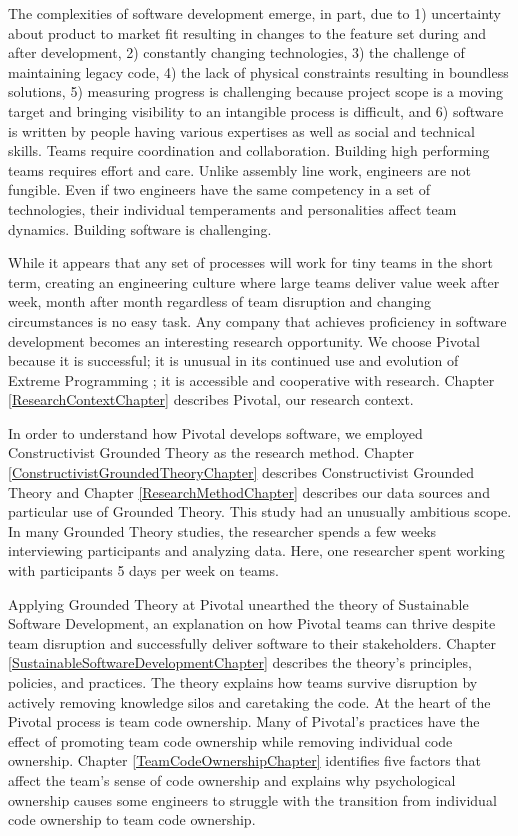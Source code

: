 The complexities of software development emerge, in part, due to 1) uncertainty about product to market fit resulting in changes to the feature set during and after development, 2) constantly changing technologies, 3) the challenge of maintaining legacy code, 4) the lack of physical constraints resulting in boundless solutions, 5) measuring progress is challenging because project scope is a moving target and bringing visibility to an intangible process is difficult, and 6) software is written by people having various expertises as well as social and technical skills. Teams require coordination and collaboration. Building high performing teams requires effort and care. Unlike assembly line work, engineers are not fungible. Even if two engineers have the same competency in a set of technologies, their individual temperaments and personalities affect team dynamics. Building software is challenging. 

While it appears that any set of processes will work for tiny teams in the short term, creating an engineering culture where large teams deliver value week after week, month after month regardless of team disruption and changing circumstances is no easy task. Any company that achieves proficiency in software development becomes an interesting research opportunity. We choose Pivotal because it is successful; it is unusual in its continued use and evolution of Extreme Programming \cite{BeckExtremeProgramming2004};  it is accessible and cooperative with research. Chapter \ref{ResearchContextChapter} describes Pivotal, our research context. 

In order to understand how Pivotal develops software, we employed Constructivist Grounded Theory as the research method. Chapter \ref{ConstructivistGroundedTheoryChapter} describes Constructivist Grounded Theory and Chapter \ref{ResearchMethodChapter} describes our data sources and particular use of Grounded Theory. This study had an unusually ambitious scope. In many Grounded Theory studies, the researcher spends a few weeks interviewing participants and analyzing data. Here, one researcher spent \durationOfResearchStudyPlural{} working with participants 5 days per week on \numberOfObservedProjects{} teams. 

Applying Grounded Theory at Pivotal unearthed the theory of Sustainable Software Development, an explanation on how Pivotal teams can thrive despite team disruption and successfully deliver software to their stakeholders. Chapter \ref{SustainableSoftwareDevelopmentChapter} describes the theory’s principles, policies, and practices. The theory explains how teams survive disruption by actively removing knowledge silos and caretaking the code. At the heart of the Pivotal process is team code ownership. Many of Pivotal’s practices have the effect of promoting team code ownership while removing individual code ownership. Chapter \ref{TeamCodeOwnershipChapter} identifies five factors that affect the team’s sense of code ownership and explains why psychological ownership causes some engineers to struggle with the transition from individual code ownership to team code ownership. 

